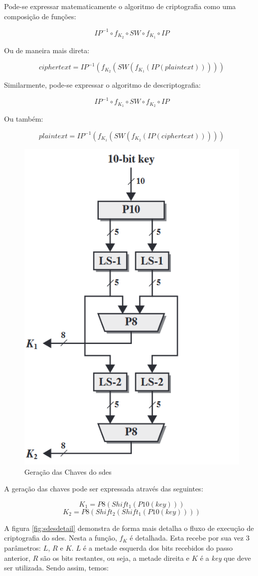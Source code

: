 Pode-se expressar matematicamente o algoritmo de criptografia como uma composição de funções:

\[IP^{-1} \circ f_{K_2} \circ SW \circ f_{K_1} \circ IP\]

Ou de maneira mais direta:

\[ciphertext = IP^{-1}(f_{K_2}(SW(f_{K_1}(IP(plaintext)))))\]

Similarmente, pode-se expressar o algoritmo de descriptografia:

\[IP^{-1} \circ f_{K_1} \circ SW \circ f_{K_2} \circ IP\]

Ou também:

\[plaintext = IP^{-1}(f_{K_1}(SW(f_{K_2}(IP(ciphertext)))))\]

\begin{figure}[H]
    \centering
    \caption{Geração das Chaves do \acrshort{sdes}}
    \includegraphics[width=.5\linewidth]{Figuras/SDESKeysGen.png}
\end{figure}

A geração das chaves pode ser expressada através das seguintes:

\[K_1 = P8(Shift_1(P10(key)))\]
\[K_2 = P8(Shift_2(Shift_1(P10(key))))\]

A figura \ref{fig:sdesdetail} demonstra de forma mais detalha o fluxo de execução de criptografia do \acrshort{sdes}. Nesta a função, \(f_K\) é detalhada. Esta recebe por sua vez 3 parâmetros: \(L\), \(R\) e \(K\). \(L\) é a metade esquerda dos bits recebidos do passo anterior, \(R\) são os bits restantes, ou seja, a metade direita e \(K\) é a \textit{key} que deve ser utilizada. Sendo assim, temos:

